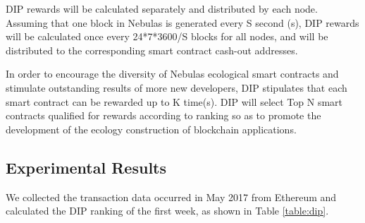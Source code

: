 DIP rewards will be calculated separately and distributed by each node. Assuming that one block in Nebulas is generated every S second (s),
DIP rewards will be calculated once every 24*7*3600/S blocks for all nodes, and will be distributed to the corresponding smart contract cash-out addresses. 


In order to encourage the diversity of Nebulas ecological smart contracts and stimulate outstanding results of more new developers, DIP stipulates that each smart contract can be rewarded up to K time(s). DIP will select Top N smart contracts qualified for rewards according to ranking so as to promote the development of the ecology construction of blockchain applications.


\subsection{Experimental Results}
\label{dip:economic}

We collected the transaction data occurred in May 2017 from Ethereum and calculated the DIP ranking of the first week, as shown in Table \ref{table:dip}.



